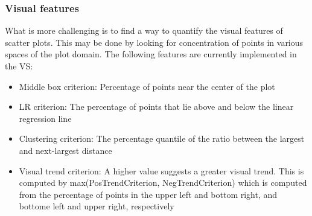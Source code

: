\subsubsection{Visual features}

What is more challenging is to find a way to quantify the visual features of 
scatter plots. This may be done by looking for concentration of points in 
various spaces of the plot domain. The following features are currently 
implemented in the VS: 

\tablespacing
\begin{itemize}
	\item Middle box criterion: Percentage of points near the center of the plot
	\item LR criterion: The percentage of points that lie above and below the 
	linear regression line
	\item Clustering criterion: The percentage quantile of the ratio between 
	the largest and next-largest distance
	\item Visual trend criterion: A higher value suggests a greater visual 
	trend. This is computed by max(PosTrendCriterion, NegTrendCriterion) which 
	is computed from the percentage of points in the upper left and bottom 
	right, and bottome left and upper right, respectively
\end{itemize}
\bodyspacing